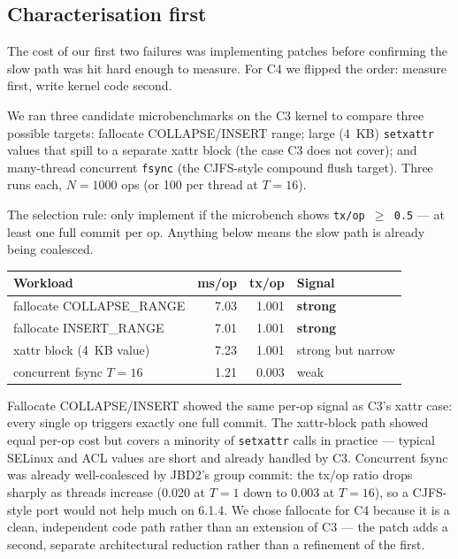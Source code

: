 \documentclass[12pt,a4paper]{article}
\begin{document}
\subsection{Characterisation first}

The cost of our first two failures was implementing patches before
confirming the slow path was hit hard enough to measure.  For C4
we flipped the order: measure first, write kernel code second.

We ran three candidate microbenchmarks on the C3 kernel to compare
three possible targets: fallocate COLLAPSE/INSERT range; large
(4~KB) \texttt{setxattr} values that spill to a separate xattr
block (the case C3 does not cover); and many-thread concurrent
\texttt{fsync} (the CJFS-style compound flush target).  Three runs
each, $N=1000$ ops (or 100 per thread at $T=16$).

The selection rule: only implement if the microbench shows
\texttt{tx/op $\ge$ 0.5} --- at least one full commit per op.
Anything below means the slow path is already being coalesced.

\begin{center}
\begin{tabular}{lrrl}
\toprule
Workload & ms/op & tx/op & Signal \\
\midrule
fallocate COLLAPSE\_RANGE & 7.03 & 1.001 & \textbf{strong} \\
fallocate INSERT\_RANGE   & 7.01 & 1.001 & \textbf{strong} \\
xattr block (4~KB value)  & 7.23 & 1.001 & strong but narrow \\
concurrent fsync $T=16$   & 1.21 & 0.003 & weak \\
\bottomrule
\end{tabular}
\end{center}

Fallocate COLLAPSE/INSERT showed the same per-op signal as C3's
xattr case: every single op triggers exactly one full commit.
The xattr-block path showed equal per-op cost but covers a
minority of \texttt{setxattr} calls in practice --- typical
SELinux and ACL values are short and already handled by C3.
Concurrent fsync was already well-coalesced by JBD2's group commit:
the tx/op ratio drops sharply as threads increase (0.020 at $T=1$
down to 0.003 at $T=16$), so a CJFS-style port would not help much
on 6.1.4.  We chose fallocate for C4 because it is a clean,
independent code path rather than an extension of C3 --- the patch
adds a second, separate architectural reduction rather than a
refinement of the first.
\end{document}
